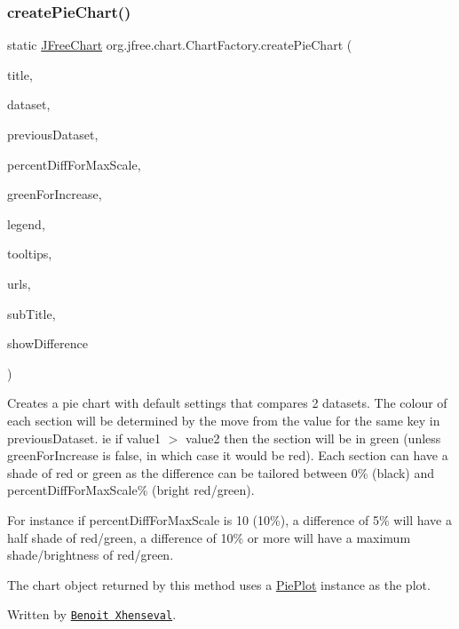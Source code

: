 \subsubsection{\texorpdfstring{create\+Pie\+Chart()}{createPieChart()}\hspace{0.1cm}{\footnotesize\ttfamily [5/5]}}
{\footnotesize\ttfamily static \mbox{\hyperlink{classorg_1_1jfree_1_1chart_1_1_j_free_chart}{J\+Free\+Chart}} org.\+jfree.\+chart.\+Chart\+Factory.\+create\+Pie\+Chart (\begin{DoxyParamCaption}\item[{String}]{title,  }\item[{\mbox{\hyperlink{interfaceorg_1_1jfree_1_1data_1_1general_1_1_pie_dataset}{Pie\+Dataset}}}]{dataset,  }\item[{\mbox{\hyperlink{interfaceorg_1_1jfree_1_1data_1_1general_1_1_pie_dataset}{Pie\+Dataset}}}]{previous\+Dataset,  }\item[{int}]{percent\+Diff\+For\+Max\+Scale,  }\item[{boolean}]{green\+For\+Increase,  }\item[{boolean}]{legend,  }\item[{boolean}]{tooltips,  }\item[{boolean}]{urls,  }\item[{boolean}]{sub\+Title,  }\item[{boolean}]{show\+Difference }\end{DoxyParamCaption})\hspace{0.3cm}{\ttfamily [static]}}

Creates a pie chart with default settings that compares 2 datasets. The colour of each section will be determined by the move from the value for the same key in {\ttfamily previous\+Dataset}. ie if value1 $>$ value2 then the section will be in green (unless {\ttfamily green\+For\+Increase} is {\ttfamily false}, in which case it would be {\ttfamily red}). Each section can have a shade of red or green as the difference can be tailored between 0\% (black) and percent\+Diff\+For\+Max\+Scale\% (bright red/green). 

For instance if {\ttfamily percent\+Diff\+For\+Max\+Scale} is 10 (10\%), a difference of 5\% will have a half shade of red/green, a difference of 10\% or more will have a maximum shade/brightness of red/green. 

The chart object returned by this method uses a \mbox{\hyperlink{}{Pie\+Plot}} instance as the plot. 

Written by \href{mailto:opensource@objectlab.co.uk}{\tt Benoit Xhenseval}.



